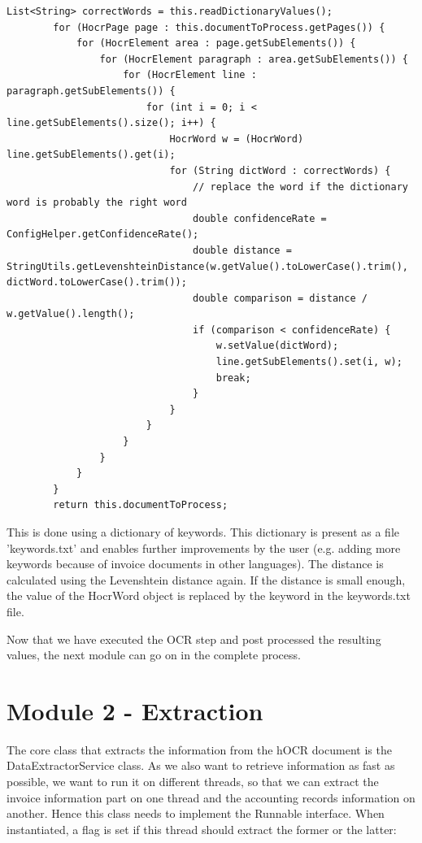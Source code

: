\begin{lstlisting}[caption={Postprocessing the hocr document}]
        List<String> correctWords = this.readDictionaryValues();
        for (HocrPage page : this.documentToProcess.getPages()) {
            for (HocrElement area : page.getSubElements()) {
                for (HocrElement paragraph : area.getSubElements()) {
                    for (HocrElement line : paragraph.getSubElements()) {
                        for (int i = 0; i < line.getSubElements().size(); i++) {
                            HocrWord w = (HocrWord) line.getSubElements().get(i);
                            for (String dictWord : correctWords) {
                                // replace the word if the dictionary word is probably the right word
                                double confidenceRate = ConfigHelper.getConfidenceRate();
                                double distance = StringUtils.getLevenshteinDistance(w.getValue().toLowerCase().trim(), dictWord.toLowerCase().trim());
                                double comparison = distance / w.getValue().length();
                                if (comparison < confidenceRate) {
                                    w.setValue(dictWord);
                                    line.getSubElements().set(i, w);
                                    break;
                                }
                            }
                        }
                    }
                }
            }
        }
        return this.documentToProcess;
\end{lstlisting}

This is done using a dictionary of keywords. This dictionary is present as a file 'keywords.txt' and enables further improvements by the user (e.g. adding more keywords because of invoice documents in other languages).
The distance is calculated using the Levenshtein distance again. If the distance is small enough, the value of the HocrWord object is replaced by the keyword in the keywords.txt file.

Now that we have executed the OCR step and post processed the resulting values, the next module can go on in the complete process.

\section{Module 2 - Extraction}
\label{sec5.5}

The core class that extracts the information from the hOCR document is the DataExtractorService class. As we also want to retrieve information as fast as possible, we want to run it on different threads, so that we can extract the invoice information part on one thread and the accounting records information on another. Hence this class needs to implement the Runnable interface. When instantiated, a flag is set if this thread should extract the former or the latter:


